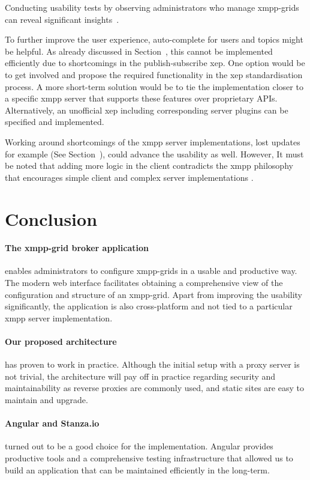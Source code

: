 Conducting usability tests by observing administrators who manage \glspl{xmpp-grid} can reveal significant insights~\cite{krug:dont-make-me-think}.

To further improve the user experience, auto-complete for users and topics might be helpful.
As already discussed in Section~, this cannot be implemented efficiently due to shortcomings in the \gls{publish-subscribe} \gls{xep}.
One option would be to get involved and propose the required functionality in the \gls{xep} standardisation process.
A more short-term solution would be to tie the implementation closer to a specific \gls{xmpp} server that supports these features over proprietary APIs.
Alternatively, an unofficial \gls{xep} including corresponding server plugins can be specified and implemented.

Working around shortcomings of the \gls{xmpp} server implementations, lost updates for example (See Section~), could advance the usability as well.
However, It must be noted that adding more logic in the client contradicts the \gls{xmpp} philosophy that encourages simple client and complex server implementations \cite{definitive-guide-xmpp}.

\section{Conclusion}
\paragraph{The \gls{xmpp-grid} \gls{broker} application} enables administrators to configure \glspl{xmpp-grid} in a usable and productive way.
The modern web interface facilitates obtaining a comprehensive view of the configuration and structure of an \gls{xmpp-grid}.
Apart from improving the usability significantly, the application is also cross-platform and not tied to a particular \gls{xmpp} server implementation.

\paragraph{Our proposed architecture} has proven to work in practice.
Although the initial setup with a proxy server is not trivial, the architecture will pay off in practice regarding security and maintainability as reverse proxies are commonly used, and static sites are easy to maintain and upgrade.

\paragraph{Angular and Stanza.io} turned out to be a good choice for the implementation.
Angular provides productive tools and a comprehensive testing infrastructure that allowed us to build an application that can be maintained efficiently in the long-term.

